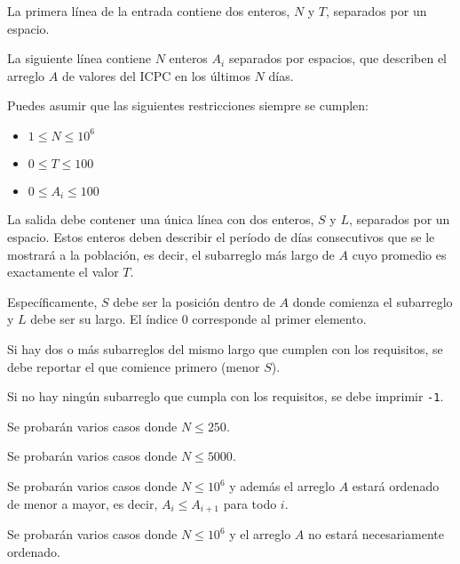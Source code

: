\documentclass{oci}
\begin{document}
\begin{inputDescription}
  La primera línea de la entrada contiene dos enteros, $N$ y $T$, separados por
  un espacio.

  La siguiente línea contiene $N$ enteros $A_i$ separados por espacios,
  que describen el arreglo $A$ de valores del ICPC en los últimos $N$
  días.

  Puedes asumir que las siguientes restricciones siempre se cumplen:

  \begin{itemize}
  \item $1 \le N \le 10^6$

  \item $0 \le T \le 100$

  \item $0 \le A_i \le 100$
  \end{itemize}
\end{inputDescription}

\begin{outputDescription}
La salida debe contener una única línea con dos enteros, $S$ y $L$, separados por
un espacio.
Estos enteros deben describir el período de días consecutivos que se le mostrará
a la población, es decir, el subarreglo más largo de $A$ cuyo promedio es
exactamente el valor $T$.

Específicamente, $S$ debe ser la posición dentro de $A$ donde comienza el
subarreglo y $L$ debe ser su largo.
El índice $0$ corresponde al primer elemento.
 
Si hay dos o más subarreglos del mismo largo que cumplen con los requisitos, se
debe reportar el que comience primero (menor $S$).

Si no hay ningún subarreglo que cumpla con los requisitos, se debe imprimir
\texttt{-1}.
\end{outputDescription}

\begin{scoreDescription}
  Se probarán varios casos donde $N \le 250$.
 
  Se probarán varios casos donde $N \le 5000$.
 
  Se probarán varios casos donde $N \le 10^6$ y además el arreglo $A$ estará ordenado de
  menor a mayor, es decir, $A_i \le A_{i+1}$ para todo $i$.
 
  Se probarán varios casos donde $N \le 10^6$ y el arreglo $A$ no estará
  necesariamente ordenado.
\end{scoreDescription}

\begin{sampleDescription}
\end{sampleDescription}
\end{document}
